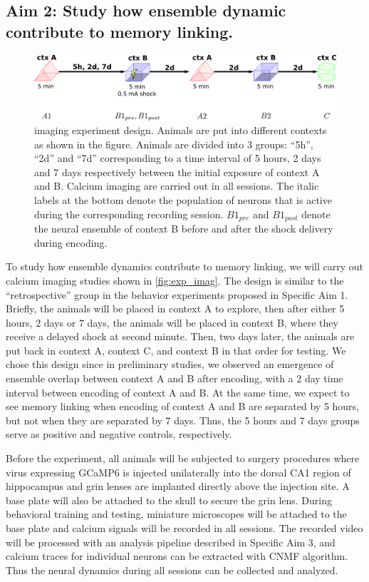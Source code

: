 \documentclass[master.tex]{subfiles}
\begin{document}
\subsection*{Aim 2: Study how ensemble dynamic contribute to memory linking.}

\begin{figure}[!hbt]
  \centering \includegraphics[scale = .135]{Figures/exp_imag.pdf}
  \caption{\footnotesize imaging experiment design. Animals are put into
    different contexts as shown in the figure. Animals are divided into 3
    groups: ``5h'', ``2d'' and ``7d'' corresponding to a time interval of 5
    hours, 2 days and 7 days respectively between the initial exposure of
    context A and B. Calcium imaging are carried out in all sessions. The italic
    labels at the bottom denote the population of neurons that is active during
    the corresponding recording session. $B1_{pre}$ and $B1_{post}$ denote the
    neural ensemble of context B before and after the shock delivery during
    encoding.}
  \label{fig:exp_imag}
\end{figure}

To study how ensemble dynamics contribute to memory linking, we will carry out
calcium imaging studies shown in \autoref{fig:exp_imag}. The design is similar
to the ``retrospective'' group in the behavior experiments proposed in Specific
Aim 1. Briefly, the animals will be placed in context A to explore, then after
either 5 hours, 2 days or 7 days, the animals will be placed in context B, where
they receive a delayed shock at second minute. Then, two days later, the animals
are put back in context A, context C, and context B in that order for testing.
We chose this design since in preliminary studies, we observed an emergence of
ensemble overlap between context A and B after encoding, with a 2 day time
interval between encoding of context A and B. At the same time, we expect to see
memory linking when encoding of context A and B are separated by 5 hours, but
not when they are separated by 7 days. Thus, the 5 hours and 7 days groups serve
as positive and negative controls, respectively.

Before the experiment, all animals will be subjected to surgery procedures where
virus expressing GCaMP6 is injected unilaterally into the dorsal CA1 region of
hippocampus and grin lenses are implanted directly above the injection site. A
base plate will also be attached to the skull to secure the grin lens. During
behavioral training and testing, miniature microscopes will be attached to the
base plate and calcium signals will be recorded in all sessions. The recorded
video will be processed with an analysis pipeline described in Specific Aim 3,
and calcium traces for individual neurons can be extracted with CNMF algorithm.
Thus the neural dynamics during all sessions can be collected and analyzed.
\end{document}
